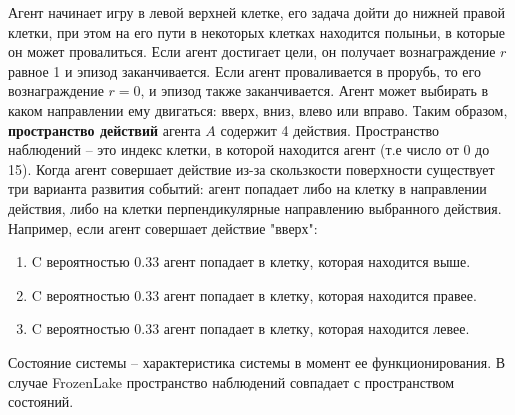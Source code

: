\documentclass[fleqn, a4paper, 14pt]{article}
\begin{document}
	Агент начинает игру в левой верхней клетке, его задача дойти до нижней правой клетки, при этом на его пути в некоторых клетках находится полыньи, в которые он может провалиться. Если агент достигает цели, он получает вознаграждение $r$ равное 1 и эпизод заканчивается. Если агент проваливается в прорубь, то его вознаграждение $r=0$, и эпизод также заканчивается. Агент может выбирать в каком направлении ему двигаться: вверх, вниз, влево или вправо.  Таким образом, \textbf{пространство действий} агента $ A $ содержит 4 действия. Пространство наблюдений -- это индекс клетки, в которой находится агент (т.е число от 0 до 15). 
	Когда агент совершает действие из-за скользкости поверхности существует три варианта развития событий: агент попадает либо на клетку в направлении действия, либо на клетки перпендикулярные направлению выбранного действия. Например, если агент совершает действие "вверх":
	\begin{enumerate}
	\item C вероятностью 0.33 агент попадает в клетку, которая находится выше.
	\item C вероятностью 0.33 агент попадает в клетку, которая находится правее.
	\item C вероятностью 0.33 агент попадает в клетку, которая находится левее.
	\end{enumerate}
	Состояние системы -- характеристика системы в момент ее функционирования. В случае FrozenLake пространство наблюдений совпадает с пространством состояний. 
	
\end{document}
